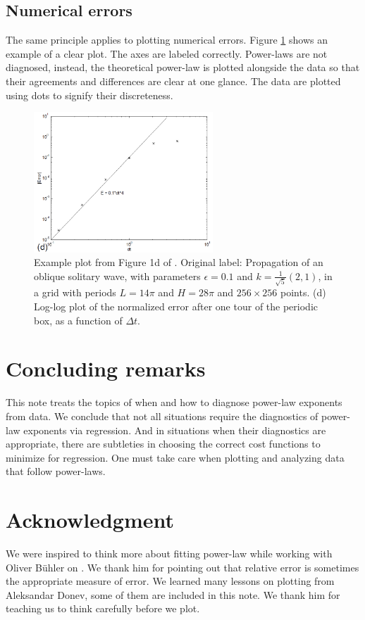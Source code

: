 \documentclass[11pt,letterpaper]{article}
\begin{document}
\subsection{Numerical errors}
The same principle applies to plotting numerical errors. Figure \ref{fig_numInt_example} shows an example of a clear plot. The axes are labeled correctly. Power-laws are not diagnosed, instead, the theoretical power-law is plotted alongside the data so that their agreements and differences are clear at one glance. The data are plotted using dots to signify their discreteness.
\begin{figure}
    \centering
    \includegraphics[width = 0.6\textwidth]{figs/numInt_example}
    \caption{Example plot from Figure 1d of \cite{MilewskiTabak_99}. Original label: {\small Propagation of an oblique solitary wave, with parameters $\epsilon = 0.1$ and $k = \frac{1}{\sqrt{5}}(2,1)$, in a grid with periods $L = 14\pi$ and $H = 28\pi$ and $256 \times 256$ points. (d) Log-log plot of the normalized error after one tour of the periodic box, as a function of $\Delta t$.}}
    \label{fig_numInt_example}
\end{figure}

\section{Concluding remarks}
This note treats the topics of when and how to diagnose power-law exponents from data. We conclude that not all situations require the diagnostics of power-law exponents via regression. And in situations when their diagnostics are appropriate, there are subtleties in choosing the correct cost functions to minimize for regression. One must take care when plotting and analyzing data that follow power-laws.

\section*{Acknowledgment}
We were inspired to think more about fitting power-law while working with  Oliver B\"uhler on \cite{DuBuhler_23}. We thank him for pointing out that relative error is sometimes the appropriate measure of error. We learned many lessons on plotting from Aleksandar Donev, some of them are included in this note. We thank him for teaching us to think carefully before we plot. 


\newpage
\printbibliography
\end{document}
